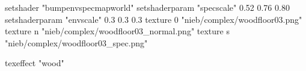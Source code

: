 setshader "bumpenvspecmapworld"
setshaderparam "specscale" 0.52 0.76 0.80
setshaderparam "envscale"  0.3 0.3 0.3
   texture 0 "nieb/complex/woodfloor03.png"
   texture n "nieb/complex/woodfloor03_normal.png"
   texture s "nieb/complex/woodfloor03_spec.png"

texeffect "wood"
